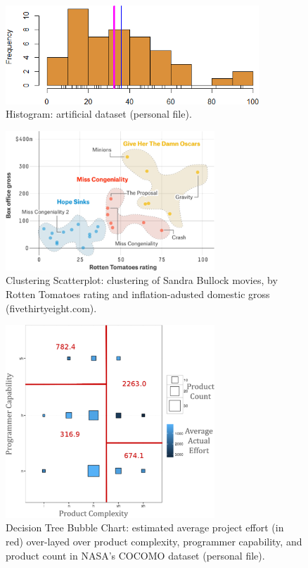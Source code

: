 \afterpage{\FloatBarrier}
\vfill
\begin{figure}[t]
\centering
\includegraphics[width=0.85\textwidth]{Images/Histogram_of_GAS.png}
\caption[\small Histogram: artificial dataset ]{\small Histogram: artificial dataset (personal file).} \label{fig:ex_hist_GAS}
\end{figure}
\afterpage{\FloatBarrier}
\vfill 
\newpage
\vfill
\begin{figure}[t]
\centering
\includegraphics[width=0.7\textwidth]{Images/clustering.png}
\caption[\small Clustering Scatterplot: clustering of Sandra Bullock movies ]{\small Clustering Scatterplot: clustering of Sandra Bullock movies, by Rotten Tomatoes rating and inflation-adusted domestic gross (fivethirtyeight.com).} \label{fig:ex_cl_bul}
\end{figure}
\afterpage{\FloatBarrier}
\vfill
\begin{figure}[t]
\centering
\includegraphics[width=0.7\textwidth]{Images/combined.png}
\caption[\small Decision Tree Bubble Chart: NASA's COCOMO dataset ]{\small Decision Tree Bubble Chart: estimated average project effort (in red) over-layed over product complexity, programmer capability, and product count in NASA's COCOMO dataset (personal file).} \label{fig:ex_sdt_comps}
\end{figure}
